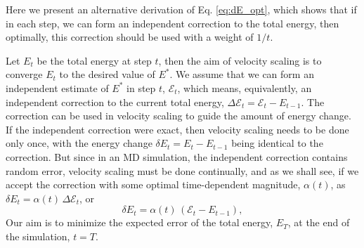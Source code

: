 \documentclass[reprint]{revtex4-1}
\begin{document}
Here we present an alternative derivation of Eq. \eqref{eq:dE_opt},
which shows that if in each step, we can form an independent correction
to the total energy,
then optimally,
this correction should be used
with a weight of $1/t$.

Let $E_t$ be the total energy at step $t$,
then the aim of velocity scaling is to converge $E_t$
to the desired value of $E^*$.
%
We assume that we can form an independent estimate of $E^*$
in step $t$, $\mathcal E_t$,
which means, equivalently, an independent correction
to the current total energy,
$\Delta \mathcal E_t = \mathcal E_t - E_{t-1}$.
%
The correction can be used in velocity scaling
to guide the amount of energy change.
%
If the independent correction were exact,
then velocity scaling needs to be done only once,
with the energy change $\delta E_t = E_t - E_{t-1}$
being identical to the correction.
%
But since in an MD simulation,
the independent correction contains random error,
velocity scaling must be done continually,
and as we shall see,
if we accept the correction with some
optimal time-dependent magnitude, $\alpha(t)$,
as
$\delta E_t = \alpha(t) \, \Delta \mathcal E_t$,
or
%
\begin{equation}
  \delta E_t = \alpha(t) \, \left( \mathcal E_t - E_{t - 1} \right)
  ,
  \label{eq:Eupdate}
\end{equation}
%
Our aim is to minimize
the expected error of the total energy, $E_T$,
at the end of the simulation, $t = T$.
\end{document}
